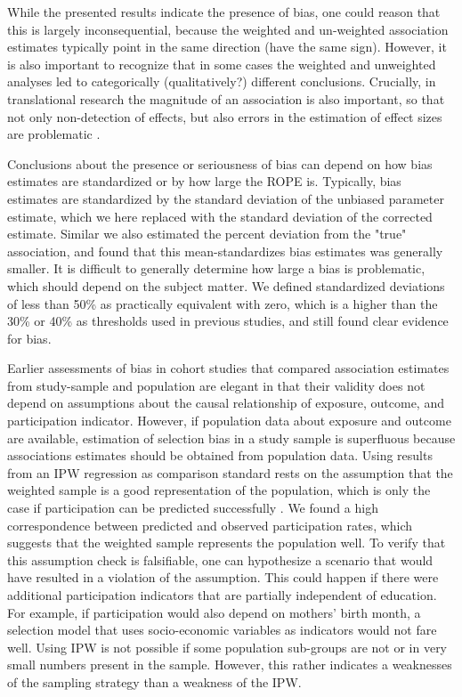 \documentclass[]{article}
\begin{document}
While the presented results indicate the presence of bias, one could reason that this is largely inconsequential, because the weighted and un-weighted association estimates typically point in the same direction (have the same sign). However, it is also important to recognize that in some cases the weighted and unweighted analyses led to categorically (qualitatively?) different conclusions. Crucially, in translational research the magnitude of an association is also important, so that not only non-detection of effects, but also errors in the estimation of effect sizes are problematic \supercite{Sullivan2012-uc}.

Conclusions about the presence or seriousness of bias can depend on how bias estimates are standardized or by how large the ROPE is. Typically, bias estimates are standardized by the standard deviation of the unbiased parameter estimate\supercite{Stuart2010-cj}, which we here replaced with the standard deviation of the corrected estimate. Similar \citeauthor{Nilsen2009-ci}\supercite{Nilsen2009-ci} we also estimated the percent deviation from the "true" association, and found that this mean-standardizes bias estimates was generally smaller. It is difficult to generally determine how large a bias is problematic, which should depend on the subject matter. We defined standardized deviations of less than 50\% as practically equivalent with zero, which is a higher than the 30\% or 40\% as thresholds used in previous studies\supercite{Greene2011-am, Stuart2010-cj}, and still found clear evidence for bias.

Earlier assessments of bias in cohort studies that compared association estimates from study-sample and population are elegant in that their validity does not depend on assumptions about the causal relationship of exposure, outcome, and participation indicator. However, if population data about exposure and outcome are available, estimation of selection bias in a study sample is superfluous because associations estimates should be obtained from population data. Using results from an IPW regression as comparison standard rests on the assumption that the weighted sample is a good representation of the population, which is only the case if participation can be predicted successfully \supercite{Seaman2013-rj}. We found a high correspondence between predicted and observed participation rates, which suggests that the weighted sample represents the population well. To verify that this assumption check is falsifiable, one can hypothesize a scenario that would have resulted in a violation of the assumption. This could happen if there were additional participation indicators that are partially independent of education. For example, if participation would also depend on mothers' birth month, a selection model that uses socio-economic variables as indicators would not fare well. Using IPW is not possible if some population sub-groups are not or in very small numbers present in the sample. However, this rather indicates a weaknesses of the sampling strategy than a weakness of the IPW.
\end{document}
